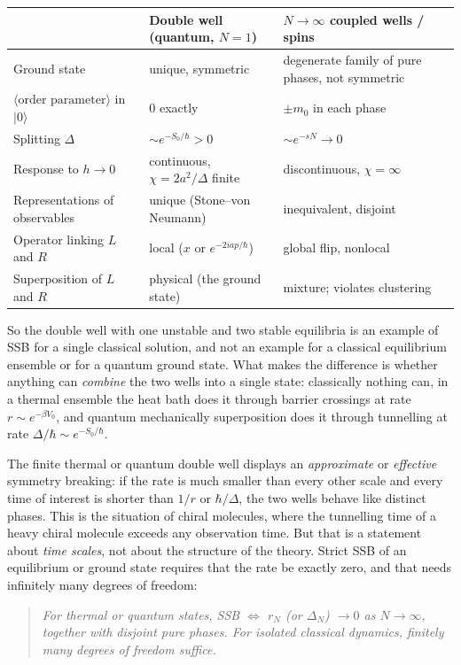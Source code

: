 \documentclass[11pt,a4paper]{article}
\theoremstyle{definition}
\theoremstyle{remark}
\newcommand{\hb}{\hbar}
\newcommand{\ket}[1]{|#1\rangle}
\newcommand{\ev}[1]{\langle #1\rangle}
\begin{document}
\begin{table}[ht]
\centering
\small
\begin{tabular}{@{}p{4.6cm}p{5.4cm}p{5.2cm}@{}}
\toprule
 & Double well (quantum, $N=1$) & $N\to\infty$ coupled wells / spins\\
\midrule
Ground state & unique, symmetric & degenerate family of pure phases, not symmetric\\
$\ev{\text{order parameter}}$ in $\ket{0}$ & $0$ exactly & $\pm m_0$ in each phase\\
Splitting $\Delta$ & $\sim e^{-S_0/\hb}>0$ & $\sim e^{-sN}\to0$\\
Response to $h\to0$ & continuous, $\chi=2a^2/\Delta$ finite & discontinuous, $\chi=\infty$\\
Representations of observables & unique (Stone--von Neumann) & inequivalent, disjoint\\
Operator linking $L$ and $R$ & local ($x$ or $e^{-2iap/\hb}$) & global flip, nonlocal\\
Superposition of $L$ and $R$ & physical (the ground state) & mixture; violates clustering\\
\bottomrule
\end{tabular}
\end{table}

So the double well with one unstable and two stable equilibria is an example of SSB for a single classical
solution, and not an example for a classical equilibrium ensemble or for a quantum ground state. What makes the
difference is whether anything can \emph{combine} the two wells into a single state: classically nothing can, in a
thermal ensemble the heat bath does it through barrier crossings at rate $r\sim e^{-\beta V_0}$, and
quantum mechanically superposition does it through tunnelling at rate $\Delta/\hb\sim e^{-S_0/\hb}$.

The finite thermal or quantum double well displays an \emph{approximate} or \emph{effective} symmetry breaking:
if the rate is much smaller than every other scale and every time of interest is shorter than $1/r$ or
$\hb/\Delta$, the two wells behave like distinct phases. This is the situation of chiral molecules, where the
tunnelling time of a heavy chiral molecule exceeds any observation time. But that is a statement about \emph{time
scales}, not about the structure of the theory. Strict SSB of an equilibrium or ground state requires that the
rate be exactly zero, and that needs infinitely many degrees of freedom:
\begin{quote}
\emph{For thermal or quantum states, SSB $\iff$ $r_N$ (or $\Delta_N$) $\to0$ as $N\to\infty$, together with
disjoint pure phases. For isolated classical dynamics, finitely many degrees of freedom suffice.}
\end{quote}
\end{document}
